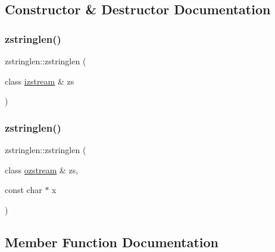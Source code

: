 \subsection{Constructor \& Destructor Documentation}
\mbox{\label{classzstringlen_ae616a813b06db3cabf2affabf3daab75}} 
\subsubsection{\texorpdfstring{zstringlen()}{zstringlen()}\hspace{0.1cm}{\footnotesize\ttfamily [1/2]}}
{\footnotesize\ttfamily zstringlen\+::zstringlen (\begin{DoxyParamCaption}\item[{class \mbox{\hyperlink{classizstream}{izstream}} \&}]{zs }\end{DoxyParamCaption})\hspace{0.3cm}{\ttfamily [inline]}}

\mbox{\label{classzstringlen_adc39dd75c544f35a3c56f74b405602d2}} 
\subsubsection{\texorpdfstring{zstringlen()}{zstringlen()}\hspace{0.1cm}{\footnotesize\ttfamily [2/2]}}
{\footnotesize\ttfamily zstringlen\+::zstringlen (\begin{DoxyParamCaption}\item[{class \mbox{\hyperlink{classozstream}{ozstream}} \&}]{zs,  }\item[{const char $\ast$}]{x }\end{DoxyParamCaption})\hspace{0.3cm}{\ttfamily [inline]}}



\subsection{Member Function Documentation}
\mbox{\label{classzstringlen_a4027f6245694bc4ac5ca2f4719aa2982}} 
